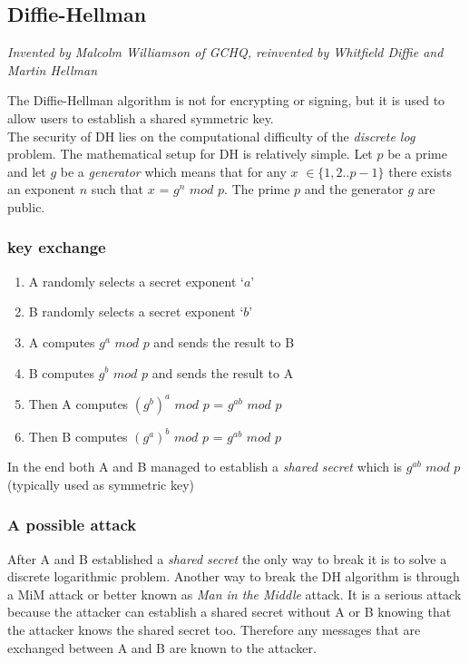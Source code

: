 \documentclass[a4paper]{article}
\begin{document}
\subsection{Diffie-Hellman}
\begin{center}
   \textit{Invented by Malcolm Williamson of GCHQ, reinvented by Whitfield Diffie and Martin Hellman}
\end{center}
The Diffie-Hellman algorithm is not for encrypting or signing, but it is used to allow users to establish a shared symmetric key.\\
The security of DH lies on the computational difficulty of the \textit{discrete log} problem. The mathematical setup for DH is relatively simple. Let $p$ be a prime and let $g$ be a \textit{generator} which means that for any $x$ $\in \{1,2..p-1\}$ there exists an exponent $n$ such that $x$ = $g^n$ $mod$ $p$. The prime $p$ and the generator $g$ are public.

\subsubsection{key exchange}
\begin{enumerate}
\item A randomly selects a secret exponent `$a$'
\item B randomly selects a secret exponent `$b$'
\item A computes $g^a$ $mod$ $p$ and sends the result to B
\item B computes $g^b$ $mod$ $p$ and sends the result to A
\item Then A computes $(g^b)^a$ $mod$ $p$ = $g^{ab}$ $mod$ $p$
\item Then B computes $(g^a)^b$ $mod$ $p$ = $g^{ab}$ $mod$ $p$
\end{enumerate}
In the end both A and B managed to establish a \textit{shared secret} which is $g^{ab}$ $mod$ $p$ (typically used as symmetric key)

\subsubsection{A possible attack}
After A and B established a \textit{shared secret} the only way to break it is to solve a discrete logarithmic problem. Another way to break the DH algorithm is through a MiM attack or better known as \textit{Man in the Middle} attack. It is a serious attack because the attacker can establish a shared secret without A or B knowing that the attacker knows the shared secret too. Therefore any messages that are exchanged between A and B are known to the attacker.
\end{document}

